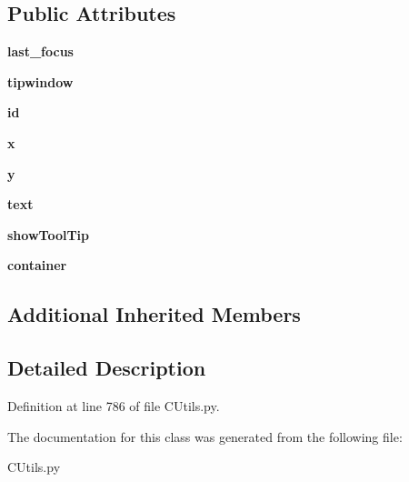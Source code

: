 \subsection*{Public Attributes}
\begin{DoxyCompactItemize}
\item 
\mbox{\label{class_c_utils_1_1_utils_1_1_u_i_1_1_controls_1_1_scrolled_tree_view_a6c622a9a7ebc7bbaabf43e1490b2ac1f}} 
{\bfseries last\+\_\+focus}
\item 
\mbox{\label{class_c_utils_1_1_utils_1_1_u_i_1_1_controls_1_1_scrolled_tree_view_a5463352dcbbdaaeb782f0484b30f87f1}} 
{\bfseries tipwindow}
\item 
\mbox{\label{class_c_utils_1_1_utils_1_1_u_i_1_1_controls_1_1_scrolled_tree_view_acf2488b95c97e0378c9bf49de3b50f28}} 
{\bfseries id}
\item 
\mbox{\label{class_c_utils_1_1_utils_1_1_u_i_1_1_controls_1_1_scrolled_tree_view_a9336ebf25087d91c818ee6e9ec29f8c1}} 
{\bfseries x}
\item 
\mbox{\label{class_c_utils_1_1_utils_1_1_u_i_1_1_controls_1_1_scrolled_tree_view_a2fb1c5cf58867b5bbc9a1b145a86f3a0}} 
{\bfseries y}
\item 
\mbox{\label{class_c_utils_1_1_utils_1_1_u_i_1_1_controls_1_1_scrolled_tree_view_af575f17e6be3f269b86b041a60560dbf}} 
{\bfseries text}
\item 
\mbox{\label{class_c_utils_1_1_utils_1_1_u_i_1_1_controls_1_1_scrolled_tree_view_a5b16ea76b064935dd1a830d81ba2bac5}} 
{\bfseries show\+Tool\+Tip}
\item 
\mbox{\label{class_c_utils_1_1_utils_1_1_u_i_1_1_controls_1_1_scrolled_tree_view_a030ecaa2a61b422a8ca7422403ad8c77}} 
{\bfseries container}
\end{DoxyCompactItemize}
\subsection*{Additional Inherited Members}


\subsection{Detailed Description}


Definition at line 786 of file C\+Utils.\+py.



The documentation for this class was generated from the following file\+:\begin{DoxyCompactItemize}
\item 
C\+Utils.\+py\end{DoxyCompactItemize}
